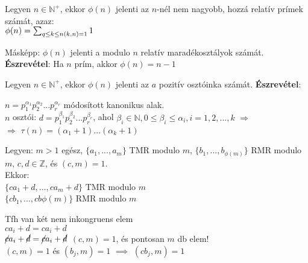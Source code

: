 \begin{frame}
  \begin{tcolorbox}[title={Def.: Az Euler-féle $\phi$ függvény}]
    Legyen $n \in \mathbb{N}^+$, ekkor ${\phi}(n)$ jelenti az $n$-nél nem nagyobb, hozzá relatív prímek számát, azaz:\\
    ${\phi}(n) = \sum_{q \leq k \leq n\\ (k, n) = 1} 1$\\
    \mmedskip

    Másképp: ${\phi}(n)$ jelenti a modulo $n$ relatív maradékosztályok számát.
  \tcblower
    \textbf{Észrevétel}: Ha $n$ prím, akkor ${\phi}(n) = n - 1$
  \end{tcolorbox}

  \begin{tcolorbox}[title={Def.: A $\tau$ függvény}]
    Legyen $n \in \mathbb{N}^+$, ekkor ${\phi}(n)$ jelenti az $a$ pozitív osztóinka számát.
  \tcblower
    \textbf{Észrevétel}:\\
    \msmallskip


    $n = p_1^{{\alpha}_1}p_2^{{\alpha}_2}...p_r^{{\alpha}_r}$ módosított kanonikus alak.\\
    \msmallskip
    $n$ osztói: $d = p_1^{{\beta}_1}p_2^{{\beta}_2}...p_r^{{\beta}_r}$, ahol ${\beta}_i \in \mathbb{N}, 0 \leq {\beta}_i \leq {\alpha}_i, i = 1, 2, ..., k$ $\Rightarrow$\\
    $\Rightarrow$ ${\tau}(n) = ({\alpha}_1 + 1)...({\alpha}_k + 1)$
  \end{tcolorbox}
\end{frame}

\begin{frame}
  \begin{tcolorbox}[title={Tétel: Omnibusz tétel}]
    Legyen: $m > 1$ egész, $\{a_1, ..., a_m\}$ TMR modulo $m$, $\{b_1, ..., b_{{\phi}(m)}\}$ RMR modulo $m$, $c, d \in \mathbb{Z}$, és $(c,m) = 1$.\\
    \smallskip
    Ekkor:\\
    \smallskip
    $\{ ca_1 + d, ..., ca_m + d \}$ TMR modulo $m$\\
    $\{ cb_1, ..., cb{{\phi}(m)}\}$ RMR modulo $m$
  \end{tcolorbox}

  \begin{tcolorbox}[title={Bizonyítás (Indirekt)}]
    Tfh van két nem inkongruens elem\\
    $ca_i + d = ca_i + d$\\
    ${\cancel{c}}a_i + {\cancel{d}} = {\cancel{c}}a_i + {\cancel{d}}$ $(c, m) = 1$, és pontosan $m$ db elem!\\
    $(c, m) = 1$ és $(b_j,m) = 1$ $\implies$ $(cb_j, m) = 1$
  \end{tcolorbox}
\end{frame}

